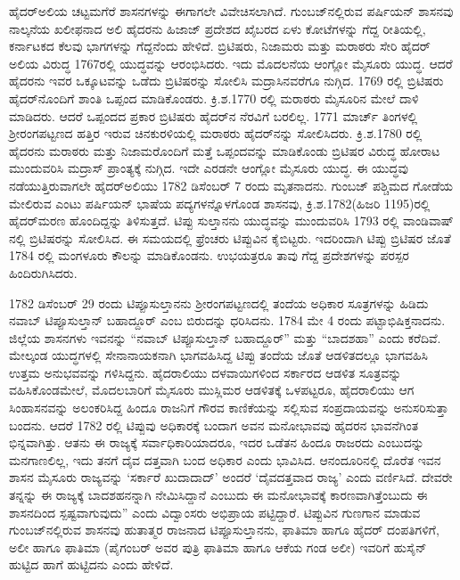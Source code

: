 ಹೈದರ್​ಅಲಿಯ ಚಟ್ಟಮಗೆರೆ ಶಾಸನಗಳನ್ನು ಈಗಾಗಲೇ ವಿವೇಚಿಸಲಾಗಿದೆ. ಗುಂಬಜ್​ನಲ್ಲಿರುವ ಪರ್ಷಿಯನ್​ ಶಾಸನವು ನಾಲ್ಕನೆಯ ಖಲೀಫನಾದ ಅಲಿ ಹೈದರನು ಹಿಜಾಜ್​ ಪ್ರದೇಶದ ಖೈಬರದ ಏಳು ಕೋಟೆಗಳನ್ನು ಗೆದ್ದ ರೀತಿಯಲ್ಲಿ, ಕರ್ನಾಟಕದ ಕೆಲವು ಭಾಗಗಳನ್ನು ಗೆದ್ದನೆಂದು ಹೇಳಿದೆ. ಬ್ರಿಟಿಷರು, ನಿಜಾಮರು ಮತ್ತು ಮರಾಠರು ಸೇರಿ ಹೈದರ್​ ಅಲಿಯ ವಿರುದ್ಧ 1767ರಲ್ಲಿ ಯುದ್ಧವನ್ನು ಆರಂಭಿಸಿದರು. ಇದು ಮೊದಲನೆಯ ಆಂಗ್ಲೋ ಮೈಸೂರು ಯುದ್ಧ. ಆದರೆ ಹೈದರನು ಇವರ ಒಕ್ಕೂಟವನ್ನು ಒಡೆದು ಬ್ರಿಟಿಷರನ್ನು ಸೋಲಿಸಿ ಮದ್ರಾಸಿನವರೆಗೂ ನುಗ್ಗಿದ. 1769 ರಲ್ಲಿ ಬ್ರಿಟಿಷರು ಹೈದರ್​ನೊಂದಿಗೆ ಶಾಂತಿ ಒಪ್ಪಂದ ಮಾಡಿಕೊಂಡರು. ಕ್ರಿ.ಶ.1770 ರಲ್ಲಿ ಮರಾಠರು ಮೈಸೂರಿನ ಮೇಲೆ ದಾಳಿ ಮಾಡಿದರು. ಆದರೆ ಒಪ್ಪಂದದ ಪ್ರಕಾರ ಬ್ರಿಟಿಷರು ಹೈದರ್​ನ ನೆರವಿಗೆ ಬರಲಿಲ್ಲ. 1771 ಮಾರ್ಚ್ ತಿಂಗಳಲ್ಲಿ ಶ‍್ರೀರಂಗಪಟ್ಟಣದ ಹತ್ತಿರ ಇರುವ ಚಿನಕುರಳಿಯಲ್ಲಿ ಮರಾಠರು ಹೈದರ್​ನನ್ನು ಸೋಲಿಸಿದರು. ಕ್ರಿ.ಶ.1780 ರಲ್ಲಿ ಹೈದರನು ಮರಾಠರು ಮತ್ತು ನಿಜಾಮರೊಂದಿಗೆ ಮತ್ತೆ ಒಪ್ಪಂದವನ್ನು ಮಾಡಿಕೊಂಡು ಬ್ರಿಟಿಷರ ವಿರುದ್ಧ ಹೋರಾಟ ಮುಂದುವರಿಸಿ ಮದ್ರಾಸ್​ ಪ್ರಾಂತ್ಯಕ್ಕೆ ನುಗ್ಗಿದ. ಇದೇ ಎರಡನೇ ಆಂಗ್ಲೋ ಮೈಸೂರು ಯುದ್ಧ. ಈ ಯುದ್ಧವು ನಡೆಯುತ್ತಿರುವಾಗಲೇ ಹೈದರ್​ಅಲಿಯು 1782 ಡಿಸೆಂಬರ್​ 7 ರಂದು ಮೃತನಾದನು. ಗುಂಬಜ್​ ಪಶ್ಚಿಮದ ಗೋಡೆಯ ಮೇಲಿರುವ ಎಂಟು ಪರ್ಷಿಯನ್​ ಭಾಷೆಯ ಪದ್ಯಗಳನ್ನೊಳಗೊಂಡ ಶಾಸನವು, ಕ್ರಿ.ಶ.1782(ಹಿಜರಿ 1195)ರಲ್ಲಿ ಹೈದರ್​ ಮರಣ ಹೊಂದಿದ್ದನ್ನು ತಿಳಿಸುತ್ತದೆ. ಟಿಪ್ಪು ಸುಲ್ತಾನನು ಯುದ್ಧವನ್ನು ಮುಂದುವರಿಸಿ 1793 ರಲ್ಲಿ ವಾಂಡಿವಾಷ್​ನಲ್ಲಿ ಬ್ರಿಟಿಷರನ್ನು ಸೋಲಿಸಿದ. ಈ ಸಮಯದಲ್ಲಿ ಫ್ರೆಂಚರು ಟಿಪ್ಪುವಿನ ಕೈಬಿಟ್ಟರು. ಇದರಿಂದಾಗಿ ಟಿಪ್ಪು ಬ್ರಿಟಿಷರ ಜೊತೆ 1784 ರಲ್ಲಿ ಮಂಗಳೂರು ಕೌಲನ್ನು ಮಾಡಿಕೊಂಡನು. ಉಭಯತ್ರರೂ ತಾವು ಗೆದ್ದ ಪ್ರದೇಶಗಳನ್ನು ಪರಸ್ಪರ ಹಿಂದಿರುಗಿಸಿದರು.

1782 ಡಿಸೆಂಬರ್​ 29 ರಂದು ಟಿಪ್ಪೂಸುಲ್ತಾನನು ಶ‍್ರೀರಂಗಪಟ್ಟಣದಲ್ಲಿ ತಂದೆಯ ಅಧಿಕಾರ ಸೂತ್ರಗಳನ್ನು ಹಿಡಿದು ನವಾಬ್​ ಟಿಪ್ಪೂಸುಲ್ತಾನ್​ ಬಹಾದ್ದೂರ್​ ಎಂಬ ಬಿರುದನ್ನು ಧರಿಸಿದನು. 1784 ಮೇ 4 ರಂದು ಪಟ್ಟಾಭಿಷಿಕ್ತನಾದನು. ಜಿಲ್ಲೆಯ ಶಾಸನಗಳು ಇವನನ್ನು “ನವಾಬ್​ ಟಿಪ್ಪೂಸುಲ್ತಾನ್​ ಬಹಾದ್ದೂರ್​” ಮತ್ತು “ಬಾದಶಹಾ” ಎಂದು ಕರೆದಿವೆ. ಮೇಲ್ಕಂಡ ಯುದ್ಧಗಳಲ್ಲಿ ಸೇನಾನಾಯಕನಾಗಿ ಭಾಗವಹಿಸಿದ್ದ ಟಿಪ್ಪು ತಂದೆಯ ಜೊತೆ ಆಡಳಿತದಲ್ಲೂ ಭಾಗವಹಿಸಿ ಉತ್ತಮ ಅನುಭವವನ್ನು ಗಳಿಸಿದ್ದನು. ಹೈದರಾಲಿಯು ದಳವಾಯಿಗಳಿಂದ ಸರ್ಕಾರದ ಆಡಳಿತ ಸೂತ್ರವನ್ನು ವಹಿಸಿಕೊಂಡಮೇಲೆ, ಮೊದಲಬಾರಿಗೆ ಮೈಸೂರು ಮುಸ್ಲಿಮರ ಆಡಳಿತಕ್ಕೆ ಒಳಪಟ್ಟರೂ, ಹೈದರಾಲಿಯು ಆಗ ಸಿಂಹಾಸನವನ್ನು ಅಲಂಕರಿಸಿದ್ದ ಹಿಂದೂ ರಾಜನಿಗೆ ಗೌರವ ಕಾಣಿಕೆಯನ್ನು ಸಲ್ಲಿಸುವ ಸಂಪ್ರದಾಯವನ್ನು ಅನುಸರಿಸುತ್ತಾ ಬಂದನು. ಆದರೆ 1782 ರಲ್ಲಿ ಟಿಪ್ಪುವು ಅಧಿಕಾರಕ್ಕೆ ಬಂದಾಗ ಅವನ ಮನೋಭಾವವು ಹೈದರನ ಭಾವನೆಗಿಂತ ಭಿನ್ನವಾಗಿತ್ತು. ಆತನು ಈ ರಾಜ್ಯಕ್ಕೆ ಸರ್ವಾಧಿಕಾರಿಯಾದರೂ, ಇದರ ಒಡೆತನ ಹಿಂದೂ ರಾಜರದು ಎಂಬುದನ್ನು ಮನಗಾಣಲಿಲ್ಲ, ಇದು ತನಗೆ ದೈವ ದತ್ತವಾಗಿ ಬಂದ ಅಧಿಕಾರ ಎಂದು ಭಾವಿಸಿದ. ಆನಂದೂರಿನಲ್ಲಿ ದೊರೆತ ಇವನ ಶಾಸನ ಮೈಸೂರು ರಾಜ್ಯವನ್ನು ‘ಸರ್ಕಾರೆ ಖುದಾದಾದ್​’ ಅಂದರೆ ‘ದೈವದತ್ತವಾದ ರಾಜ್ಯ’ ಎಂದು ವರ್ಣಿಸಿದೆ. ದೇವರೇ ತನ್ನನ್ನು ಈ ರಾಜ್ಯಕ್ಕೆ ಬಾದಶಹನನ್ನಾಗಿ ನೇಮಿಸಿದ್ದಾನೆ ಎಂಬುದು ಈ ಮನೋಭಾವಕ್ಕೆ ಕಾರಣವಾಗಿತ್ತೆಂಬುದು ಈ ಶಾಸನದಿಂದ ಸ್ಪಷ್ಟವಾಗುವುದು” ಎಂದು ವಿದ್ವಾಂಸರು ಅಭಿಪ್ರಾಯ ಪಟ್ಟಿದ್ದಾರೆ. ಟಿಪ್ಪುವಿನ ಗುಣಗಾನ ಮಾಡುವ ಗುಂಬಜ್​ನಲ್ಲಿರುವ ಶಾಸನವು ಹುತಾತ್ಮರ ರಾಜನಾದ ಟಿಪ್ಪೂಸುಲ್ತಾನನು, ಫಾತಿಮಾ ಹಾಗೂ ಹೈದರ್​ ದಂಪತಿಗಳಿಗೆ, ಅಲೀ ಹಾಗೂ ಫಾತಿಮಾ (ಪೈಗಂಬರ್​ ಅವರ ಪುತ್ರಿ ಫಾತಿಮಾ ಹಾಗೂ ಆಕೆಯ ಗಂಡ ಅಲೀ) ಇವರಿಗೆ ಹುಸೈನ್​ ಹುಟ್ಟಿದ ಹಾಗೆ ಹುಟ್ಟಿದನು ಎಂದು ಹೇಳಿದೆ.

